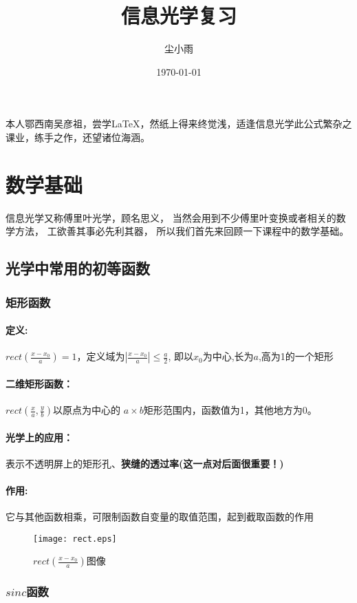 \documentclass[UTF8]{ctexart}
\title{信息光学复习}%
\author{尘小雨}%
\date{\today}
\newcommand{\rect}[1]{rect( \f{x-x_{0}}{#1})}%
\newcommand{\rectt}[2]{rect( \f{x}{#1},\f{y}{#2})}%
\newcommand{\f}[2]{\frac{#1}{#2}}%
\begin{document}
本人鄂西南吴彦祖，尝学\LaTeX，然纸上得来终觉浅，适逢信息光学此公式繁杂之课业，练手之作，还望诸位海涵。
\maketitle%
\tableofcontents   %
\section{数学基础}%
信息光学又称傅里叶光学，顾名思义，
当然会用到不少傅里叶变换或者相关的数学方法，
工欲善其事必先利其器，
所以我们首先来回顾一下课程中的数学基础。%
 \subsection{光学中常用的初等函数}%
  \subsubsection{矩形函数}%
    \paragraph{定义:}%
    $\rect{a}=1$，定义域为$\left\vert\f{x-x_{0}}{a}\right\vert\le\f{a}{2}$,%
即以$x_{0}$为中心,长为$a$,高为1的一个矩形
    \paragraph{二维矩形函数：}$\rectt{a}{b}$以原点为中心的
$a\times b$矩形范围内，函数值为1，其他地方为0。
    \paragraph{光学上的应用：}表示不透明屏上的矩形孔、\textbf{狭缝的透过率(这一点对后面很重要！)}%
    \paragraph{作用:}它与其他函数相乘，可限制函数自变量的取值范围，起到截取函数的作用
     \begin{figure}
      \centering
      \texttt{[image: rect.eps]}
      \caption{$\rect{a}$图像}
     \end{figure}%
     \subsubsection{$sinc$函数}%
\end{document}

